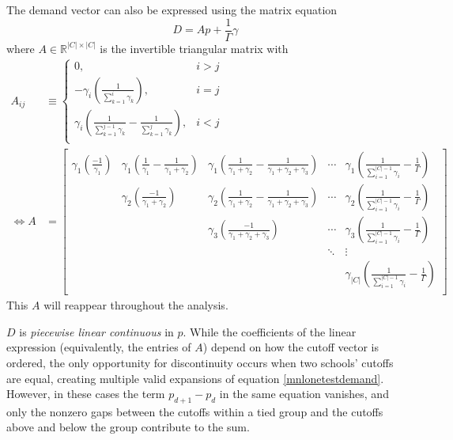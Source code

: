 \documentclass[12pt]{article}
\numberwithin{equation}{subsection}
\theoremstyle{definition}
\begin{document}
The demand vector can also be expressed using the matrix equation
\begin{equation}D = A p + \frac{1}{\Gamma}\gamma \label{demandmatrixeq}\end{equation}
where $A\in \mathbb{R}^{|C| \times |C|}$ is the invertible triangular matrix with
\begin{align} \label{Adef}
A_{ij} &\equiv \begin{cases}
0, & i > j \\
-\gamma_i \left(\frac{1}{ \sum_{k=1}^i \gamma_k}\right), & i=j \\
\gamma_i \left( \frac{1}{\sum_{k=1}^{j-1} \gamma_k} -  \frac{1}{\sum_{k=1}^{j} \gamma_k}\right), & i<j \\
\end{cases} \\[.8em]
\iff A &= \begin{bmatrix}
\gamma_1 \left( \frac{-1}{\gamma_1} \right) & \gamma_1 \left(\frac{1}{\gamma_1} - \frac{1}{\gamma_1 + \gamma_2} \right) & \gamma_1 \left(\frac{1}{\gamma_1 + \gamma_2} - \frac{1}{\gamma_1 + \gamma_2 + \gamma_3} \right) & \cdots &  \gamma_1 \left(\frac{1}{\sum_{i=1}^{|C| - 1}\gamma_i} - \frac{1}{\Gamma}  \right)  \\
 & \gamma_2 \left( \frac{-1}{\gamma_1 + \gamma_2} \right) & \gamma_2 \left(\frac{1}{\gamma_1 + \gamma_2} - \frac{1}{\gamma_1 + \gamma_2 + \gamma_3} \right) & \cdots &  \gamma_2 \left(\frac{1}{\sum_{i=1}^{|C| - 1}\gamma_i} - \frac{1}{\Gamma} \right)  \\
 &  & \gamma_3 \left( \frac{-1}{\gamma_1 + \gamma_2 + \gamma_3} \right) & \cdots &  \gamma_3 \left(\frac{1}{\sum_{i=1}^{|C| - 1}\gamma_i} - \frac{1}{\Gamma} \right)  \\
 & & & \ddots & \vdots \\
 &  &  &  &  \gamma_{|C|} \left(\frac{1}{\sum_{i=1}^{|C| - 1}\gamma_i} -\frac{1}{\Gamma}  \right)  \\
\end{bmatrix}\end{align}
This $A$ will reappear throughout the analysis. 

$D$ is \emph{piecewise linear continuous} in $p$. While the coefficients of the linear expression (equivalently, the entries of $A$) depend on how the cutoff vector is ordered, the only opportunity for discontinuity occurs when two schools' cutoffs are equal, creating multiple valid expansions of equation \eqref{mnlonetestdemand}. However, in these cases the term $p_{d+1} - p_d$ in the same equation vanishes, and only the nonzero gaps between the cutoffs within a tied group and the cutoffs above and below the group contribute to the sum. 
\end{document}
